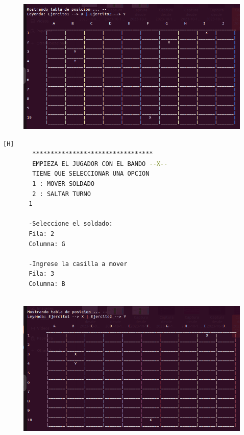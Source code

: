 \documentclass{article}
\begin{document}
	\begin{figure}[H]
		\centering
		\includegraphics[width=1.0\textwidth,keepaspectratio]{img/Commit8.3.png}
	\end{figure}
	\begin{lstlisting}[language=bash,caption={Ejecucion:}][H]
		*********************************
		EMPIEZA EL JUGADOR CON EL BANDO --X-- 
		TIENE QUE SELECCIONAR UNA OPCION
		1 : MOVER SOLDADO
		2 : SALTAR TURNO
	   1
	   
	   -Seleccione el soldado: 
	   Fila: 2 
	   Columna: G
	   
	   -Ingrese la casilla a mover
	   Fila: 3
	   Columna: B
	   
	\end{lstlisting}
	\begin{figure}[H]
		\centering
		\includegraphics[width=1.0\textwidth,keepaspectratio]{img/Commit8.4.png}
	\end{figure}
\end{document}
